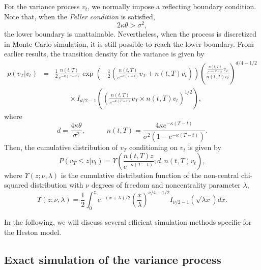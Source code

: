 \documentclass[12pt]{article}
\begin{document}
  For the variance process $v_t$, we normally impose a reflecting boundary condition. Note that,
  when the {\it Feller condition} is satisfied,
  \begin{equation}
    2\kappa\theta >\sigma^2,
  \end{equation}
  the lower boundary is unattainable. Nevertheless, when the process is discretized in Monte Carlo
  simulation, it is still possible to reach the lower boundary. From earlier results, the transition
  density for the variance is given by
  \begin{eqnarray}
    p\left(\left. v_T\right|v_t\right)&=&\frac{1}{2}\frac{n(t,T)}{e^{-\kappa(T-t)}}
          \exp\left(-\frac{1}{2}\left(\frac{n(t,T)}{e^{-\kappa(T-t)}}v_T+n(t,T)v_t\right)\right)
          \left(\frac{\displaystyle \frac{n(t,T)}{e^{-\kappa(T-t)}}v_T}{n(t,T)v_t}\right)^{d/4-1/2}\nonumber\\
          && \quad\quad\times I_{d/2-1}\left(\left(\frac{n(t,T)}{e^{-\kappa(T-t)}}v_T\times n(t,T)v_t\right)^{1/2}\right),
  \end{eqnarray}
  where
  \begin{equation}
    d=\frac{4\kappa\theta}{\sigma^2},\quad\quad\quad n(t,T) = \frac{4\kappa e^{-\kappa(T-t)}}{\sigma^2\left(1-e^{-\kappa(T-t)}\right)}.
  \end{equation}
  Then, the cumulative distribution of $v_T$ conditioning on $v_t$ is given by
  \begin{equation}
    \label{condition}
    P\left(\left. v_T \le z\right|v_t\right) = \Upsilon\left(\frac{n(t,T) z}{e^{-\kappa(T-t)}}; d, n(t,T)v_t\right),
  \end{equation}
  where $\Upsilon(z;\nu,\lambda)$ is the cumulative distribution function of the non-central chi-squared distribution
  with $\nu$ degrees of freedom and noncentrality parameter $\lambda$,
  \begin{equation}
    \Upsilon\left(z;\nu,\lambda\right)=\frac{1}{2}\int_0^z e^{-(x+\lambda)/2}\left(\frac{x}{\lambda}\right)^{\nu/4-1/2}
            I_{\nu/2-1}\left(\sqrt{\lambda x}\right)dx.
    \label{condition1}
  \end{equation}

  In the following, we will discuss several efficient simulation methods specific for the Heston model.

  \subsection{Exact simulation of the variance process}
\end{document}
